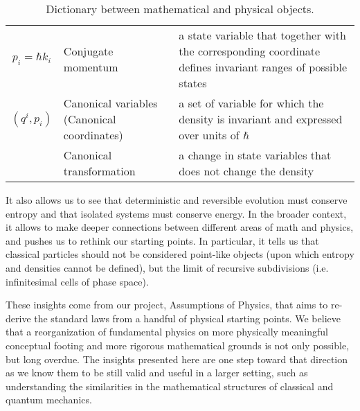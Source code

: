 \documentclass[11pt]{article}
\begin{document}
\begin{table}[h]
\begin{tabular}{c p{} p{} }
		$p_i=\hbar k_i$ & Conjugate momentum & a state variable that together with the corresponding coordinate defines invariant ranges of possible states \\
		$(q^i, p_i)$ & Canonical variables \newline (Canonical coordinates) & a set of variable for which the density is invariant and expressed over units of $\hbar$\\ 
		& Canonical transformation & a change in state variables that does not change the density\\ 
	\end{tabular}
	\caption{Dictionary between mathematical and physical objects.}
	\label{dictionary}
\end{table}
It also allows us to see that deterministic and reversible evolution must conserve entropy and that isolated systems must conserve energy. In the broader context, it allows to make deeper connections between different areas of math and physics, and pushes us to rethink our starting points. In particular, it tells us that classical particles should not be considered point-like objects (upon which entropy and densities cannot be defined), but the limit of recursive subdivisions (i.e. infinitesimal cells of phase space).

These insights come from our project, Assumptions of Physics, that aims to re-derive the standard laws from a handful of physical starting points. We believe that a reorganization of fundamental physics on more physically meaningful conceptual footing and more rigorous mathematical grounds is not only possible, but long overdue. The insights presented here are one step toward that direction as we know them to be still valid and useful in a larger setting, such as understanding the similarities in the mathematical structures of classical and quantum mechanics.

\begin{thebibliography}{0}
	
\end{thebibliography}
\end{document}
